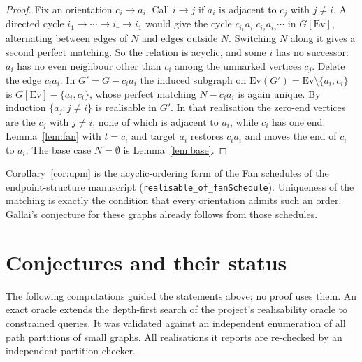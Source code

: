 \documentclass[11pt]{amsart}
\theoremstyle{definition}
\newcommand{\Ev}{\mathrm{Ev}}
\begin{document}
\begin{proof}
Fix an orientation $c_i\to a_i$. Call $i\to j$ if $a_i$ is adjacent to $c_j$ with $j\neq i$. A directed
cycle $i_1\to\cdots\to i_r\to i_1$ would give the cycle $c_{i_1}a_{i_1}c_{i_2}a_{i_2}\cdots$ in $G[\Ev]$,
alternating between edges of $N$ and edges outside $N$. Switching $N$ along it gives a second perfect
matching. So the relation is acyclic, and some $i$ has no successor: $a_i$ has no even neighbour other
than $c_i$ among the unmarked vertices $c_j$. Delete the edge $c_ia_i$. In $G'=G-c_ia_i$ the induced
subgraph on $\Ev(G')=\Ev\setminus\{a_i,c_i\}$ is $G[\Ev]-\{a_i,c_i\}$, whose perfect matching
$N-c_ia_i$ is again unique. By induction $\{a_j:j\ne i\}$ is realisable in $G'$. In that realisation the
zero-end vertices are the $c_j$ with $j\neq i$, none of which is adjacent to $a_i$, while $c_i$ has one
end. Lemma~\ref{lem:fan} with $t=c_i$ and target $a_i$ restores $c_ia_i$ and moves the end of $c_i$ to $a_i$.
The base case $N=\emptyset$ is Lemma~\ref{lem:base}.
\end{proof}

Corollary~\ref{cor:upm} is the acyclic-ordering form of the Fan schedules of the endpoint-structure
manuscript (\texttt{realisable\_of\_fanSchedule}). Uniqueness of the matching is exactly the condition
that every orientation admits such an order. Gallai's conjecture for these graphs already follows from
those schedules.

\section{Conjectures and their status}\label{sec:conj}

The following computations guided the statements above; no proof uses them. An exact oracle extends the
depth-first search of the project's realisability oracle to constrained queries. It was validated
against an independent enumeration of all path partitions of small graphs. All realisations it reports
are re-checked by an independent partition checker.
\end{document}
